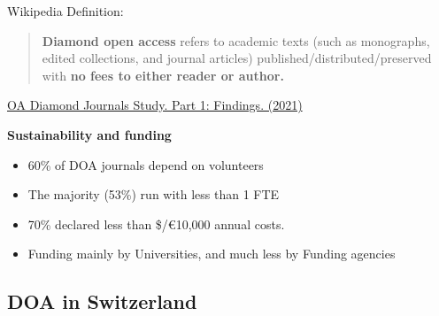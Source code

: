\documentclass[10pt,compress,serif,aspectratio=169]{beamer}
\begin{document}
\begin{frame}[t]%
 \vskip1cm%

Wikipedia Definition:\newline \newline
 \begin{quote}
   \textbf{Diamond open access} refers to academic texts (such as monographs, edited collections, and journal articles) published/distributed/preserved with \textbf{no fees to either reader or author.} \newline
 \end{quote}

\href{https://doi.org/10.5281/zenodo.4558704}{OA Diamond Journals Study. Part 1: Findings. (2021)\newline}

\textbf{Sustainability and funding}\\
\begin{itemize}
  \item 60\% of DOA journals depend on volunteers
  \item The majority (53\%) run with less than 1 FTE
  \item 70\% declared less than \$/€10,000 annual costs.
  \item Funding mainly by Universities, and much less by Funding agencies
\end{itemize}
\end{frame}


\subsection{DOA in Switzerland}
\end{document}
